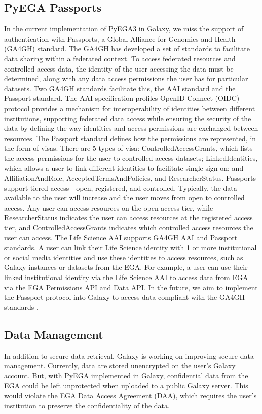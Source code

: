 \subsection*{PyEGA Passports}
In the current implementation of PyEGA3 in Galaxy, we miss the support of authentication with Passports, a Global Alliance for Genomics and Health (GA4GH) standard. The GA4GH has developed a set of standards to facilitate data sharing within a federated context. To access federated resources and controlled access data, the identity of the user accessing the data must be determined, along with any data access permissions the user has for particular datasets. Two GA4GH standards facilitate this, the AAI standard and the Passport standard. The AAI specification profiles OpenID Connect (OIDC) protocol provides a mechanism for interoperability of identities between different institutions, supporting federated data access while ensuring the security of the data by defining the way identities and access permissions are exchanged between resources. The Passport standard defines how the permissions are represented, in the form of visas. There are 5 types of visa: ControlledAccessGrants, which lists the access permissions for the user to controlled access datasets; LinkedIdentities, which allows a user to link different identities to facilitate single sign on; and AffiliationAndRole, AcceptedTermsAndPolicies, and ResearcherStatus. Passports support tiered access—open, registered, and controlled. Typically, the data available to the user will increase and the user moves from open to controlled access. Any user can access resources on the open access tier, while ResearcherStatus indicates the user can access resources at the registered access tier, and ControlledAccessGrants indicates which controlled access resources the user can access. The Life Science AAI supports GA4GH AAI and Passport standards. A user can link their Life Science identity with 1 or more institutional or social media identities and use these identities to access resources, such as Galaxy instances or datasets from the EGA. For example, a user can use their linked institutional identity via the Life Science AAI to access data from EGA via the EGA Permissions API and Data API. In the future, we aim to implement the Passport protocol into Galaxy to access data compliant with the GA4GH standards \cite{GA4GH}.

\subsection*{Data Management}
In addition to secure data retrieval, Galaxy is working on improving secure data management. Currently, data are stored unencrypted on the user's Galaxy account. But, with PyEGA implemented in Galaxy, confidential data from the EGA could be left unprotected when uploaded to a public Galaxy server. This would violate the EGA Data Access Agreement (DAA), which requires the user's institution to preserve the confidentiality of the data.

